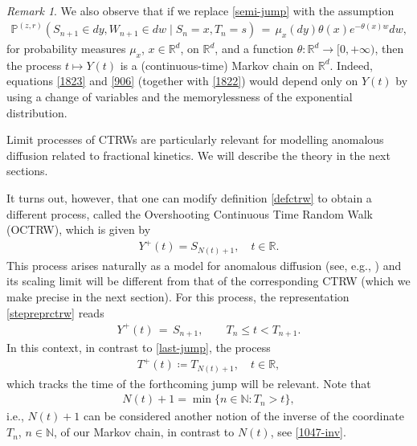 \documentclass[reqno]{amsart}
\theoremstyle{remark}
\newtheorem{remark}[theorem]{Remark}
\numberwithin{equation}{section} %
\newcommand{\R}{\mathbb{R}}
\newcommand{\N}{\mathbb{N}}
\newcommand{\RR}{\mathbb{R}}
\newcommand{\1}{\mathds{1}}
\begin{document}
	\begin{remark}
		We also observe that if we replace \eqref{semi-jump} with the assumption
		\begin{align}
			\mathds{P}^{(z,r)} \left( S_{n+1} \in dy, W_{n+1} \in dw \mid S_n=x, T_n=s  \right) \, = \, \mu_x(dy) \theta(x)e^{-\theta(x) w} dw,
		\end{align}
		for probability measures $\mu_x$, $x\in \R^d$, on $\R^d$, and a function $\theta:\R^d\to [0,+\infty)$, then the process $t\mapsto Y(t)$ is a (continuous-time) Markov chain on $\mathbb{R}^d$. Indeed, equations \eqref{1823} and \eqref{906} (together with \eqref{1822}) would depend only on $Y(t)$ by using a change of variables and the memorylessness of the exponential distribution.
	\end{remark}
	
	
	Limit processes of CTRWs are particularly relevant for modelling anomalous diffusion related to fractional kinetics. We will describe the theory in the next sections.
	
	It turns out, however, that one can modify definition \eqref{defctrw} to obtain a different process, called the Overshooting Continuous Time Random Walk (OCTRW), which is given by
	\begin{align}
		Y^+(t) = S_{N(t)+1},\quad t\in\RR.
		\label{def_octrw}
	\end{align}
	This process arises naturally as a model for anomalous diffusion (see, e.g., \cite{weron2010overshooting}) and its scaling limit will be different from that of the corresponding CTRW (which we make precise in the next section). For this process, the representation \eqref{stepreprctrw} reads
	\begin{align}
		Y^+(t) \, = \, S_{n+1}, \qquad T_n \leq t < T_{n+1}.
	\end{align}
	In this context, in contrast to \eqref{last-jump}, the process
	\begin{align}
		T^+(t) \coloneqq T_{N(t)+1},\quad t\in\RR,
		\label{tnt1}
	\end{align}
	which tracks the time of the forthcoming jump will be relevant. Note that 
	\begin{align}
		N(t)+1=\min\{n\in\N: T_n>t\},
	\end{align}
	i.e., $N(t)+1$ can be considered another notion of the inverse of the coordinate $T_n$, $n\in \N$, of our Markov chain, in contrast to $N(t)$, see \eqref{1047-inv}.
	
\end{document}
